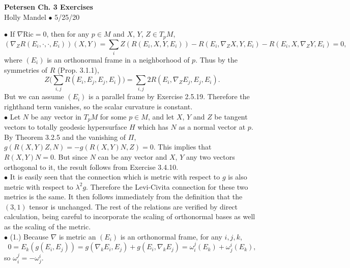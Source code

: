 \documentclass[10pt,letter]{article}
\begin{document}
\begin{center} 
{\bf Petersen Ch. 3 Exercises} \\
Holly Mandel $\bullet$ 5/25/20
\end{center}
 $\bullet$ If $\nabla \text{Ric} = 0$, then for any $p \in M$ and $X$, $Y$, $Z \in T_p M$, 
\[
(\nabla_Z R(E_i,\cdot,\cdot, E_i))(X,Y) = \sum_i Z(R(E_i,X,Y,E_i))-R(E_i,\nabla_Z X,Y,E_i)-R(E_i, X,\nabla_Z Y,E_i) = 0,
\]
where $(E_i)$ is an orthonormal frame in a neighborhood of $p$. Thus by the symmetries of $R$ (Prop. 3.1.1),
\begin{dmath*}
Z\bigg( \sum_{i,j}  R(E_i,E_j,E_j,E_i)\bigg) = \sum_{i,j} 2 R(E_i,\nabla_Z E_j,E_j,E_i).
\end{dmath*}
But we can assume $(E_i)$ is a parallel frame by Exercise 2.5.19. Therefore the righthand term vanishes, so the scalar curvature is constant.\\
 
 $\bullet$ Let $N$ be any vector in $T_pM$ for some $p \in M$, and let $X$, $Y$ and $Z$ be tangent vectors to totally geodesic hypersurface $H$ which has $N$ as a normal vector at $p$. By Theorem 3.2.5 and the vanishing of $\Pi$, $g(R(X,Y)Z,N) = -g(R(X,Y)N,Z) = 0$. This implies that $R(X,Y)N = 0$. But since $N$ can be any vector and $X$, $Y$ any two vectors orthogonal to it, the result follows from Exercise 3.4.10. \\

 $\bullet$ It is easily seen that the connection which is metric with respect to $g$ is also metric with respect to $\lambda^2 g$. Therefore the Levi-Civita connection for these two metrics is the same. It then follows immediately from the definition that the $(3,1)$ tensor is unchanged. The rest of the relations are verified by direct calculation, being careful to incorporate the scaling of orthonormal bases as well as the scaling of the metric.\\

 $\bullet$ (1.) Because $\nabla$ is metric an $(E_i)$ is an orthonormal frame, for any $i,j,k$, 
\begin{dmath*}
0 = E_k(g(E_i,E_j)) = g(\nabla_k E_i,E_j) + g(E_i,\nabla_k E_j)
= \omega^j_i(E_k) + \omega^i_j(E_k),
\end{dmath*} 
so $\omega^j_i = -\omega^i_j$. 
\end{document}
